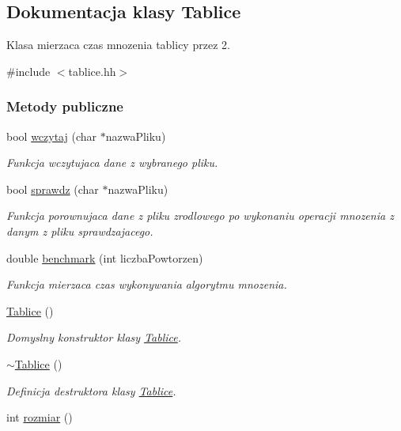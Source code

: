 \hypertarget{class_tablice}{\subsection{Dokumentacja klasy Tablice}
\label{class_tablice}
}


Klasa mierzaca czas mnozenia tablicy przez 2.  




{\ttfamily \#include $<$tablice.\-hh$>$}

\subsubsection*{Metody publiczne}
\begin{DoxyCompactItemize}
\item 
bool \hyperlink{class_tablice_aab1d6df4c268dfd27ab3f3eac119af89}{wczytaj} (char $\ast$nazwa\-Pliku)
\begin{DoxyCompactList}\small\item\em Funkcja wczytujaca dane z wybranego pliku. \end{DoxyCompactList}\item 
bool \hyperlink{class_tablice_ad0dedc4053e77713883e75ba78b0a4fb}{sprawdz} (char $\ast$nazwa\-Pliku)
\begin{DoxyCompactList}\small\item\em Funkcja porownujaca dane z pliku zrodlowego po wykonaniu operacji mnozenia z danym z pliku sprawdzajacego. \end{DoxyCompactList}\item 
double \hyperlink{class_tablice_a3b749bf8fef5c4fe6a067295abf6450a}{benchmark} (int liczba\-Powtorzen)
\begin{DoxyCompactList}\small\item\em Funkcja mierzaca czas wykonywania algorytmu mnozenia. \end{DoxyCompactList}\item 
\hyperlink{class_tablice_a7fb11a198b40ea0ef8fb110d7d2aa4ed}{Tablice} ()
\begin{DoxyCompactList}\small\item\em Domyslny konstruktor klasy \hyperlink{class_tablice}{Tablice}. \end{DoxyCompactList}\item 
\hyperlink{class_tablice_add64904c655cd0e8887e6b0a5085a89a}{$\sim$\-Tablice} ()
\begin{DoxyCompactList}\small\item\em Definicja destruktora klasy \hyperlink{class_tablice}{Tablice}. \end{DoxyCompactList}\item 
int \hyperlink{class_tablice_ad2f6b7558d1c0dbbe0dd82d08df27d76}{rozmiar} ()
\end{DoxyCompactItemize}
